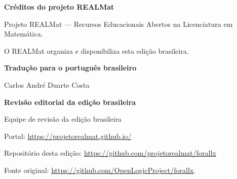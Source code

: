 \newpage
\thispagestyle{empty}%

{\Large\sf\textbf{Créditos do projeto REALMat}}

\bigskip

{\sf
Projeto REALMat — Recursos Educacionais Abertos na Licenciatura em Matemática.\par
\medskip
O REALMat organiza e disponibiliza esta edição brasileira.\par
\medskip
\textbf{Tradução para o português brasileiro}\par
\smallskip
Carlos André Duarte Costa\par
\medskip
\textbf{Revisão editorial da edição brasileira}\par
\smallskip
Equipe de revisão da edição brasileira\par
\bigskip
Portal: \url{https://projetorealmat.github.io/}\par
\smallskip
Repositório desta edição: \url{https://github.com/projetorealmat/forallx}\par
\smallskip
Fonte original: \url{https://github.com/OpenLogicProject/forallx}.
}
